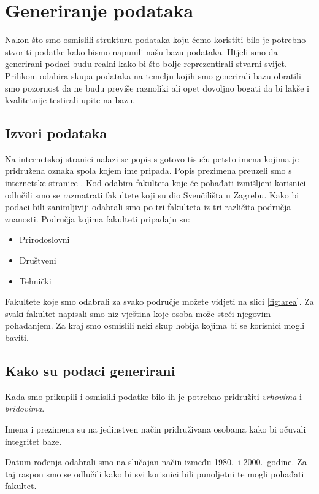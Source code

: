 \documentclass[titlepage, 12pt]{scrartcl}
\begin{document}
	\section{Generiranje podataka}
	Nakon što smo osmislili strukturu podataka koju ćemo koristiti bilo je potrebno stvoriti podatke kako bismo napunili našu bazu podataka. Htjeli smo da generirani podaci budu realni kako bi što bolje reprezentirali stvarni svijet. Prilikom odabira skupa podataka na temelju kojih smo generirali bazu obratili smo pozornost da ne budu previše raznoliki ali opet dovoljno bogati da bi lakše i kvalitetnije testirali upite na bazu.
	\subsection{Izvori podataka}
	Na internetskoj stranici \cite{imena} nalazi se popis s gotovo tisuću petsto imena kojima je pridružena oznaka spola kojem ime pripada. Popis prezimena preuzeli smo s internetske stranice \cite{prezimena}.
	Kod odabira fakulteta koje će pohađati izmišljeni korisnici odlučili smo se razmatrati fakultete koji su dio Sveučilišta u Zagrebu. Kako bi podaci bili zanimljiviji odabrali smo po tri fakulteta iz tri različita područja znanosti. Područja kojima fakulteti pripadaju su:
	\begin{itemize}
		\item Prirodoslovni
		\item Društveni
		\item Tehnički
	\end{itemize}
	Fakultete koje smo odabrali za svako područje možete vidjeti na slici \ref{fig:area}.
	Za svaki fakultet napisali smo niz vještina koje osoba može steći njegovim pohađanjem.
	Za kraj smo osmislili neki skup hobija kojima bi se korisnici mogli baviti.
	\subsection{Kako su podaci generirani}
	Kada smo prikupili i osmislili podatke bilo ih je potrebno pridružiti \emph{vrhovima} i \emph{bridovima}.
	
	Imena i prezimena su na jedinstven način pridruživana osobama kako bi očuvali integritet baze.
	
	Datum rođenja odabrali smo na slučajan način između 1980.\ i 2000.\ godine. Za taj raspon smo se odlučili kako bi svi korisnici bili punoljetni te mogli pohađati fakultet.
	
\end{document}
